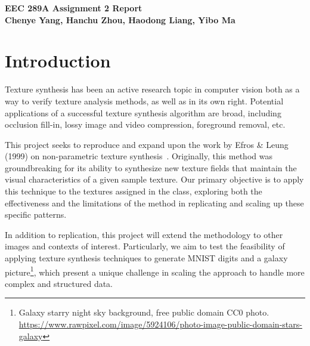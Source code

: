 \documentclass{article}
\begin{document}
\noindent
\textbf{\large EEC 289A Assignment 2 Report} \\
\textbf{\small Chenye Yang, Hanchu Zhou, Haodong Liang, Yibo Ma}



\section{Introduction}

Texture synthesis has been an active research topic in computer vision both as a way to verify texture analysis methods, as well as in its own right. Potential applications
of a successful texture synthesis algorithm are broad, including occlusion fill-in, lossy image and video compression, foreground removal, etc. 

This project seeks to reproduce and expand upon the work by Efros \& Leung (1999) on non-parametric texture synthesis~\cite{790383}. Originally, this method was groundbreaking for its ability to synthesize new texture fields that maintain the visual characteristics of a given sample texture. Our primary objective is to apply this technique to the textures assigned in the class, exploring both the effectiveness and the limitations of the method in replicating and scaling up these specific patterns.

In addition to replication, this project will extend the methodology to other images and contexts of interest. Particularly, we aim to test the feasibility of applying texture synthesis techniques to generate MNIST digits and a galaxy picture\footnote{Galaxy starry night sky background, free public domain CC0 photo. \url{https://www.rawpixel.com/image/5924106/photo-image-public-domain-stars-galaxy}}, which present a unique challenge in scaling the approach to handle more complex and structured data.

\end{document}
